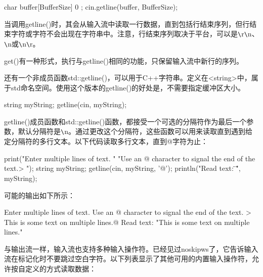 \begin{cpp}
char buffer[BufferSize] { 0 };
cin.getline(buffer, BufferSize);
\end{cpp}

当调用getline()时，其会从输入流中读取一行数据，直到包括行结束序列，但行结束字符或字符不会出现在字符串中。注意，行结束序列取决于平台，可以是\verb|\|r\verb|\|n、\verb|\|n或\verb|\|n\verb|\|r。

get()有一种形式，执行与getline()相同的功能，只保留输入流中新行的序列。

还有一个非成员函数std::getline()，可以用于C++字符串。定义在<string>中，属于std命名空间。使用这个版本的getline()的好处是，不需要指定缓冲区大小。

\begin{cpp}
string myString;
getline(cin, myString);
\end{cpp}

getline()成员函数和std::getline()函数，都接受一个可选的分隔符作为最后一个参数，默认分隔符是\verb|\|n。通过更改这个分隔符，这些函数可以用来读取直到遇到给定分隔符的多行文本。以下代码读取多行文本，直到@字符为止：

\begin{cpp}
print("Enter multiple lines of text. "
      "Use an @ character to signal the end of the text.\n> ");
string myString;
getline(cin, myString, '@');
println("Read text: \"{}\"", myString);
\end{cpp}

可能的输出如下所示：

\begin{shell}
Enter multiple lines of text. Use an @ character to signal the end of the text.
> This is some
text on multiple
lines.@
Read text: "This is some
text on multiple
lines."
\end{shell}



与输出流一样，输入流也支持多种输入操作符。已经见过noskipws了，它告诉输入流在标记化时不要跳过空白字符。以下列表显示了其他可用的内置输入操作符，允许按自定义的方式读取数据：

